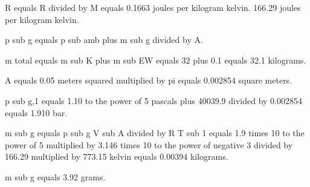 R equals R divided by M equals 0.1663 joules per kilogram kelvin.  
166.29 joules per kilogram kelvin.  

p sub g equals p sub amb plus m sub g divided by A.  

m total equals m sub K plus m sub EW equals 32 plus 0.1 equals 32.1 kilograms.  

A equals 0.05 meters squared multiplied by pi equals 0.002854 square meters.  

p sub g,1 equals 1.10 to the power of 5 pascals plus 40039.9 divided by 0.002854 equals 1.910 bar.  

m sub g equals p sub g V sub A divided by R T sub 1 equals 1.9 times 10 to the power of 5 multiplied by 3.146 times 10 to the power of negative 3 divided by 166.29 multiplied by 773.15 kelvin equals 0.00394 kilograms.  

m sub g equals 3.92 grams.